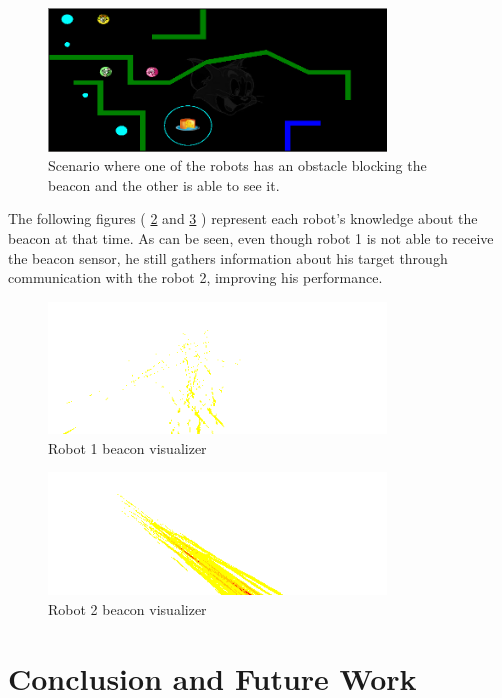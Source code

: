 \documentclass[oribibl]{llncs}
\begin{document}
\begin{figure}
  \centering
  \includegraphics[width=0.8\textwidth]{viewer.png}
  \caption{Scenario where one of the robots has an obstacle blocking the beacon and the other is able to see it.}
  \label{fig:viewer}
\end{figure}

The following figures ( \ref{fig:visualizer1} and \ref{fig:visualizer2} ) represent each robot's knowledge about the beacon at that time. As can be seen, even though robot 1 is not able to receive the beacon sensor, he still gathers information about his target through communication with the robot 2, improving his performance.

\begin{figure}
  \centering
  \includegraphics[width=0.8\textwidth]{visualizer1.png}
  \caption{Robot 1 beacon visualizer}
  \label{fig:visualizer1}
\end{figure}

\begin{figure}
  \centering
  \includegraphics[width=0.8\textwidth]{visualizer2.png}
  \caption{Robot 2 beacon visualizer}
  \label{fig:visualizer2}
\end{figure}

\section{Conclusion and Future Work}
\end{document}
